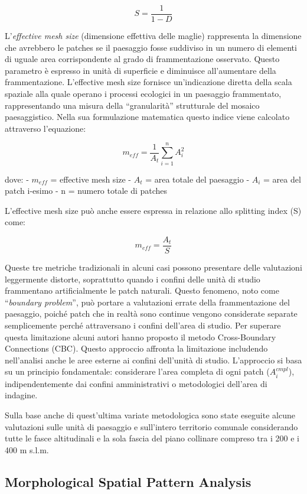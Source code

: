 \documentclass[
]{book}
\begin{document}
\[S=\frac{1}{1-D}\]

L'\emph{effective mesh size} (dimensione effettiva delle maglie) rappresenta la dimensione che avrebbero le patches se il paesaggio fosse suddiviso in un numero di elementi di uguale area corrispondente al grado di frammentazione osservato.
Questo parametro è espresso in unità di superficie e diminuisce all'aumentare della frammentazione.
L'effective mesh size fornisce un'indicazione diretta della scala spaziale alla quale operano i processi ecologici in un paesaggio frammentato, rappresentando una misura della ``granularità'' strutturale del mosaico paesaggistico.
Nella sua formulazione matematica questo indice viene calcolato attraverso l'equazione:

\[m_{eff} = \frac{1}{A_t} \sum_{i=1}^{n} A_i^2\]

dove: - \(m_{eff}\) = effective mesh size - \(A_t\) = area totale del paesaggio - \(A_i\) = area del patch i-esimo - n = numero totale di patches

L'effective mesh size può anche essere espressa in relazione allo splitting index (S) come:

\[m_{eff} = \frac{A_t}{S}\]

Queste tre metriche tradizionali in alcuni casi possono presentare delle valutazioni leggermente distorte, soprattutto quando i confini delle unità di studio frammentano artificialmente le patch naturali.
Questo fenomeno, noto come ``\emph{boundary problem}'', può portare a valutazioni errate della frammentazione del paesaggio, poiché patch che in realtà sono continue vengono considerate separate semplicemente perché attraversano i confini dell'area di studio.
Per superare questa limitazione alcuni autori \citep{moserModificationEffectiveMesh2007} hanno proposto il metodo Cross-Boundary Connections (CBC).
Questo approccio affronta la limitazione includendo nell'analisi anche le aree esterne ai confini dell'unità di studio.
L'approccio si basa su un principio fondamentale: considerare l'area completa di ogni patch (\(A^{cmpl}_i\)), indipendentemente dai confini amministrativi o metodologici dell'area di indagine.

Sulla base anche di quest'ultima variate metodologica sono state eseguite alcune valutazioni sulle unità di paesaggio e sull'intero territorio comunale considerando tutte le fasce altitudinali e la sola fascia del piano collinare compreso tra i 200 e i 400 m s.l.m.

\subsection{Morphological Spatial Pattern Analysis}\label{morphological-spatial-pattern-analysis}
\end{document}
